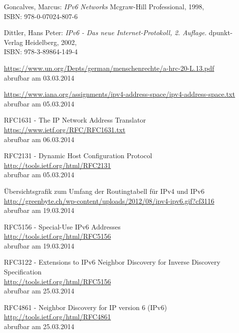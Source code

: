\documentclass[a4paper,12pt]{scrartcl}
\begin{document}
\renewcommand\refname{Literaturverzeichnis}
\begin{thebibliography}{999}

Goncalves, Marcus:   {\sl IPv6 Networks} Mcgraw-Hill Professional, 1998,
\\ISBN:  978-0-07024-807-6

Dittler, Hans Peter:  {\sl IPv6 - Das neue Internet-Protokoll, 2. Auflage}. dpunkt-Verlag Heidelberg, 2002,
\\ISBN: 978-3-89864-149-4

\end{thebibliography}

\renewcommand\refname{Quellenverzeichnis}
\begin{thebibliography}{999}

\url{https://www.un.org/Depts/german/menschenrechte/a-hrc-20-L.13.pdf}\\
abrufbar am 03.03.2014

 \url{https://www.iana.org/assignments/ipv4-address-space/ipv4-address-space.txt}\\
abrufbar am 05.03.2014

 RFC1631 - The IP Network Address Translator\\
\url{https://www.ietf.org/RFC/RFC1631.txt}\\
abrufbar am 06.03.2014

 RFC2131 - Dynamic Host Configuration Protocol\\
\url{http://tools.ietf.org/html/RFC2131}\\
abrufbar am 05.03.2014

 \"Ubersichtsgrafik zum Umfang der Routingtabell f\"ur IPv4 und IPv6\\
\url{http://greenbyte.ch/wp-content/uploads/2012/08/ipv4-ipv6.gif?cf3116}\\
abrufbar am 19.03.2014

 RFC5156 - Special-Use IPv6 Addresses \\
\url{http://tools.ietf.org/html/RFC5156}\\
abrufbar am 19.03.2014

 RFC3122 -  Extensions to IPv6 Neighbor Discovery for Inverse Discovery Specification\\
\url{http://tools.ietf.org/html/RFC5156}\\
abrufbar am 25.03.2014

 RFC4861 - Neighbor Discovery for IP version 6 (IPv6) \\
\url{http://tools.ietf.org/html/RFC4861}\\
abrufbar am 25.03.2014

\end{thebibliography}
 
 
\end{document}
